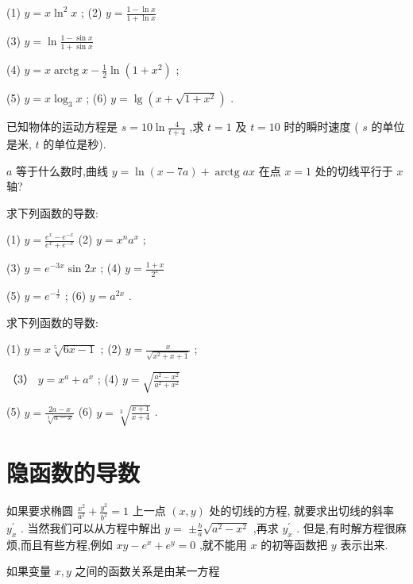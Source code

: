 \documentclass[lang=cn,newtx,10pt,scheme=chinese]{elegantbook}
\begin{document}
\begin{problemset}[习 题 六]
(1) \(y = x{\ln }^{2}x\) ; (2) \(y = \frac{1 - \ln x}{1 + \ln x}\)

(3) \(y = \ln \frac{1 - \sin x}{1 + \sin x}\)

(4) \(y = x\operatorname{arctg}x - \frac{1}{2}\ln \left( {1 + {x}^{2}}\right)\) ;

(5) \(y = x{\log }_{3}x\) ; (6) \(y = \lg \left( {x + \sqrt{1 + {x}^{2}}}\right)\) .

\item 已知物体的运动方程是 \(s = {10}\ln \frac{4}{t + 4}\) ,求 \(t = 1\) 及 \(t = {10}\) 时的瞬时速度 ( \(s\) 的单位是米, \(t\) 的单位是秒).

\item \(a\) 等于什么数时,曲线 \(y = \ln \left( {x - {7a}}\right) + \operatorname{arctg}{ax}\) 在点 \(x = 1\) 处的切线平行于 \(x\) 轴?

\item 求下列函数的导数:

(1) \(y = \frac{{e}^{x} - {e}^{-x}}{{e}^{x} + {e}^{-x}}\) (2) \(y = {x}^{n}{a}^{x}\) ;

(3) \(y = {e}^{-{3x}}\sin {2x}\) ; (4) \(y = \frac{1 + x}{{2}^{x}}\)

(5) \(y = {e}^{-\frac{1}{x}}\) ; (6) \(y = {a}^{2x}\) .

\item 求下列函数的导数:

(1) \(y = x\sqrt[5]{{6x} - 1}\) ; (2) \(y = \frac{x}{\sqrt{{x}^{2} + x + 1}}\) ;

（3） \(y = {x}^{a} + {a}^{x}\) ; (4) \(y = \sqrt{\frac{{a}^{2} - {x}^{2}}{{a}^{2} + {x}^{2}}}\)

(5) \(y = \frac{{2a} - x}{\sqrt[3]{a - x}}\) (6) \(y = \sqrt[3]{\frac{x + 1}{x + 4}}\) .

\end{problemset}

\section{隐函数的导数}

如果要求椭圆 \(\frac{{x}^{2}}{{a}^{2}} + \frac{{y}^{2}}{{b}^{2}} = 1\) 上一点 \(\left( {x,y}\right)\) 处的切线的方程, 就要求出切线的斜率 \({y}_{x}^{\prime }\) . 当然我们可以从方程中解出 \(y =\) \(\pm \frac{b}{a}\sqrt{{a}^{2} - {x}^{2}}\) ,再求 \({y}_{x}^{\prime }\) . 但是,有时解方程很麻烦,而且有些方程,例如 \({xy} - {e}^{x} + {e}^{y} = 0\) ,就不能用 \(x\) 的初等函数把 \(y\) 表示出来.

如果变量 \(x,y\) 之间的函数关系是由某一方程
\end{document}
